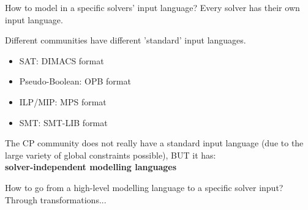 \documentclass{cons-beamer}
\begin{document}
\begin{frame}{How to model in a specific solvers' input language?}
  Every solver has their own input language.
  \vfill

  Different communities have different 'standard' input languages.
  \begin{itemize}
    \item SAT: DIMACS format
    \item Pseudo-Boolean: OPB format
    \item ILP/MIP: MPS format
    \item SMT: SMT-LIB format
  \end{itemize}
  \vspace{1em}

  The CP community does not really have a standard input language (due to the large variety of global constraints possible), BUT it has: \\
  \textbf{solver-independent modelling languages}
  \vfill

  How to go from a high-level modelling language to a specific solver input? Through transformations...
\end{frame}
\end{document}
